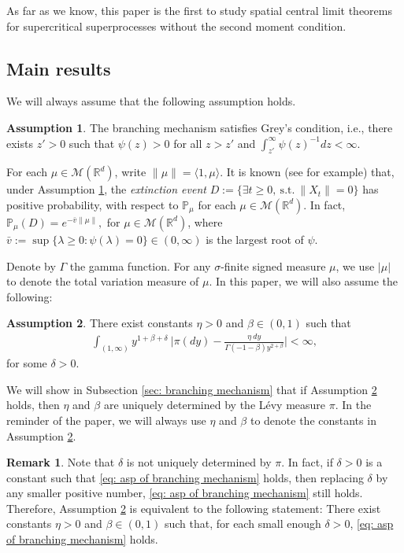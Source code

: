 \documentclass[12pt,a4paper]{amsart}
\theoremstyle{plain}
\theoremstyle{definition}
\newtheorem{rem}[thm]{Remark}
\newtheorem{asp}{Assumption}
\numberwithin{equation}{section}
\begin{document}
As far as we know, this paper is the first to study spatial central limit theorems for supercritical superprocesses without the second moment condition.

\subsection{Main results}
\label{sec: main results}{}
We will always assume that the following assumption holds.
\begin{asp}
  \label{asp: Greys condition}
  The branching mechanism satisfies Grey's condition, i.e., there exists $z' > 0$ such that $\psi(z) > 0$ for all $z>z'$ and  $\int_{z'}^\infty \psi(z)^{-1}dz < \infty$.
\end{asp}
For each $\mu \in \mathcal M(\mathbb R^d)$, write $\|\mu\| = \langle 1, \mu\rangle$.
It is known (see \cite[Theorems 12.5 \& 12.7]{Kyprianou2014Fluctuations} for example) that, under Assumption \ref{asp: Greys condition}, the \emph{extinction event} $D :=\{\exists t\geq 0,~\text{s.t.}~ \|X_t\| =0 \}$ has positive probability, with respect to $\mathbb P_\mu$ for each  $\mu \in \mathcal M(\mathbb R^d)$.
In fact, $ \mathbb{P}_{\mu} (D) = e^{-\bar v \|\mu\|}, $ for $\mu\in \mathcal M(\mathbb R^d)$, where $ \bar v := \sup\{\lambda \geq 0: \psi(\lambda) = 0\} \in (0,\infty) $ is the largest root of $\psi$.

Denote by $\Gamma$ the gamma function.
For any $\sigma$-finite signed measure $\mu$, we use $|\mu|$ to denote the total variation measure of $\mu$.
In this paper, we will also assume the following:
\begin{asp}
  \label{asp: branching mechanism}
  There exist constants $\eta > 0$ and $\beta \in (0,1)$ such that
  \begin{align}
    \label{eq: asp of branching mechanism}
    \int_{(1,\infty)}y^{1+\beta +\delta}~\Big|\pi(dy)-\frac{\eta~dy}{\Gamma(-1-\beta)y^{2+\beta}}\Big| <\infty,
  \end{align}
	for some $\delta > 0$.
\end{asp}
We will show in Subsection \ref{sec: branching mechanism} that if Assumption \ref{asp: branching mechanism} holds, then $\eta$ and $\beta$ are uniquely determined by the L\'evy measure $\pi$.
In the reminder of the paper, we will always use $\eta$ and $\beta$ to denote the constants in Assumption  \ref{asp: branching mechanism}.

\begin{rem}
  \label{rem: small enough delta}
	Note that $\delta$ is not uniquely determined by $\pi$.
	In fact, if $\delta>0$ is a constant such that \eqref{eq: asp of branching mechanism} holds, then replacing $\delta$ by any smaller positive number, \eqref{eq: asp of branching mechanism} still holds.
	Therefore, Assumption \ref{asp: branching mechanism} is equivalent to the following statement: 
	There exist constants $\eta > 0$ and $\beta \in (0,1)$ such that, for each small enough $\delta>0$, \eqref{eq: asp of branching mechanism} holds.
\end{rem}
\end{document}
